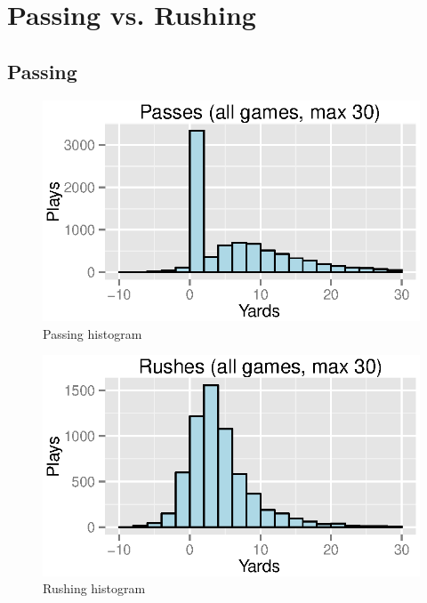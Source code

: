 \documentclass{exam}
\begin{document}
  \section{Passing vs. Rushing}

  \subsection{Passing}
  \begin{figure}[H]
    \centering
    \includegraphics{figures/nfl/passes_histogram.eps}
    \caption{Passing histogram}
  \end{figure}

  \begin{figure}[H]
    \centering
    \includegraphics{figures/nfl/rushes_histogram.eps}
    \caption{Rushing histogram}
  \end{figure}
\end{document}
